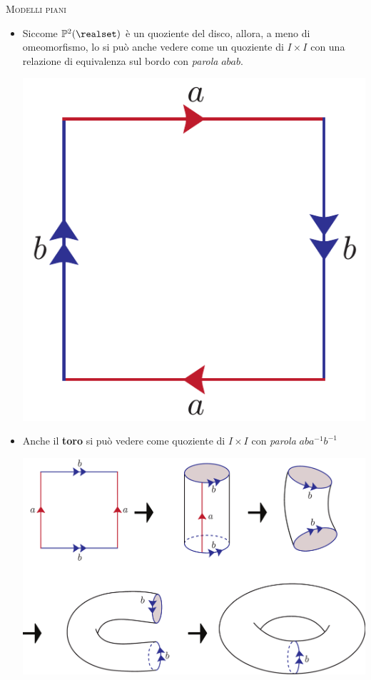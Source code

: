 \begin{examples} \textsc{Modelli piani}
	\begin{itemize}
		\item Siccome $\mathbb{P}^2(\realset)$ è un quoziente del disco, allora, a meno di omeomorfismo, lo si può anche vedere come un quoziente di $I\times I$ con una relazione di equivalenza sul bordo con \textit{parola} $abab$.
		\begin{center}
			\includegraphics[trim=0cm 0cm 0cm 0cm, clip, scale=0.4]{images/proj.pdf}
		\end{center}
		\item Anche il \textbf{toro} si può vedere come quoziente di $I\times I$ con \textit{parola} $aba^{-1}b^{-1}$
		\begin{center}
			\includegraphics[trim=0cm 0cm 0cm 0cm, clip, scale=0.4]{images/torus.pdf}

\end{center}
\end{itemize}
\end{examples}
